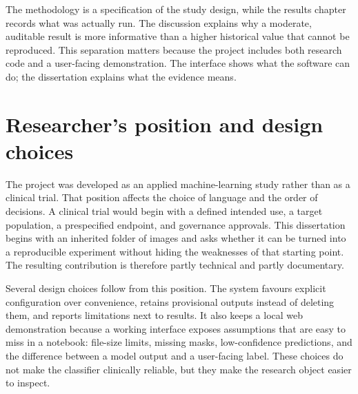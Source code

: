 The methodology is a specification of the study design, while the results chapter records what was actually run. The discussion explains why a moderate, auditable result is more informative than a higher historical value that cannot be reproduced. This separation matters because the project includes both research code and a user-facing demonstration. The interface shows what the software can do; the dissertation explains what the evidence means.

\section{Researcher's position and design choices}
The project was developed as an applied machine-learning study rather than as a clinical trial. That position affects the choice of language and the order of decisions. A clinical trial would begin with a defined intended use, a target population, a prespecified endpoint, and governance approvals. This dissertation begins with an inherited folder of images and asks whether it can be turned into a reproducible experiment without hiding the weaknesses of that starting point. The resulting contribution is therefore partly technical and partly documentary.

Several design choices follow from this position. The system favours explicit configuration over convenience, retains provisional outputs instead of deleting them, and reports limitations next to results. It also keeps a local web demonstration because a working interface exposes assumptions that are easy to miss in a notebook: file-size limits, missing masks, low-confidence predictions, and the difference between a model output and a user-facing label. These choices do not make the classifier clinically reliable, but they make the research object easier to inspect.
